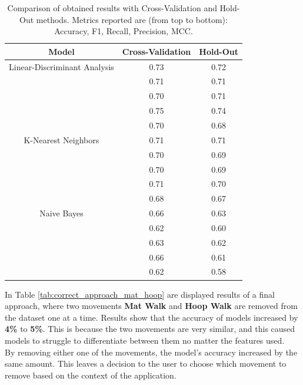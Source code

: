                 \begin{table}[htbp]
                    \centering
                    \begin{tabular}{|c|c|c|}
                    \hline
                    \textbf{Model} & \textbf{Cross-Validation} & \textbf{Hold-Out} \\ \hline
                        Linear-Discriminant Analysis    & 0.73 & 0.72 \\ 
                                                        & 0.71 & 0.71 \\ 
                                                        & 0.70 & 0.71 \\ 
                                                        & 0.75 & 0.74 \\
                                                        & 0.70 & 0.68 \\ 
                                                        \hline
                        K-Nearest Neighbors             & 0.71 & 0.71 \\ 
                                                        & 0.70 & 0.69 \\ 
                                                        & 0.70 & 0.69 \\ 
                                                        & 0.71 & 0.70 \\
                                                        & 0.68 & 0.67 \\
                                                        \hline
                        Naive Bayes                     & 0.66 & 0.63 \\ 
                                                        & 0.62 & 0.60 \\ 
                                                        & 0.63 & 0.62 \\
                                                        & 0.66 & 0.61 \\ 
                                                        & 0.62 & 0.58 \\ 
                                                        \hline
                    \end{tabular}
                    \caption{Comparison of obtained results with Cross-Validation and Hold-Out methods. Metrics reported are (from top to bottom): Accuracy, F1, Recall, Precision, MCC.}
                    \label{tab:correct_approach_cv}
                \end{table}
                \newpage
                In Table \ref{tab:correct_approach_mat_hoop} are displayed results of a final approach, where two movements \textbf{Mat Walk} and \textbf{Hoop Walk} are removed from the dataset one at a time. Results show that the accuracy of models increased by \textbf{4\%} to \textbf{5\%}. This is because the two movements are very similar, and this caused models to struggle to differentiate between them no matter the features used. \\
                By removing either one of the movements, the model's accuracy increased by the same amount. This leaves a decision to the user to choose which movement to remove based on the context of the application. 

